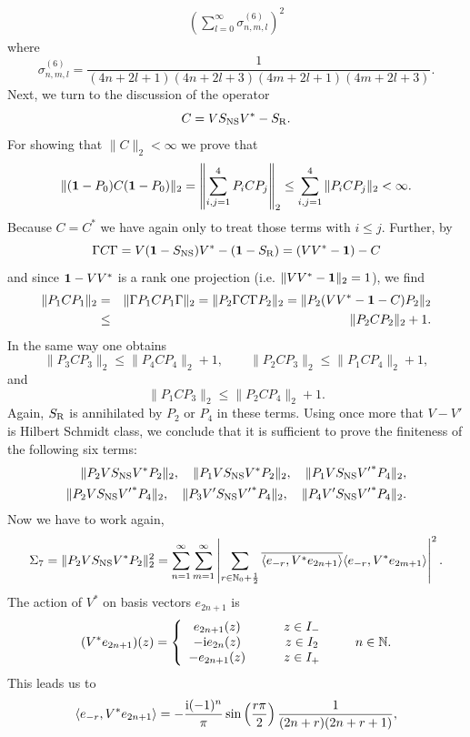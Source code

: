 \documentclass[10pt,a4paper]{article}
\begin{document}
\begin{appendix}
\begin{eqnarray*}
\left( \sum_{l=0}^\infty \sigma_{n,m,l}^{(6)} \right)^2
\end{eqnarray*}
where
\[ \sigma_{n,m,l}^{(6)} = \frac{1}{(4n+2l+1)(4n+2l+3)
(4m+2l+1)(4m+2l+3)}. \]
Next, we turn to the discussion of the operator
\[ C=VS_{\rm NS}V^*-S_{\rm R}. \]
For showing that $\|C\|_2<\infty$ we prove that
\[ \| ({\bf 1}-P_0)C({\bf 1}-P_0) \|_2 =
\left\| \sum_{i,j=1}^4 P_i C P_j \right\|_2 \le
\sum_{i,j=1}^4 \|P_i C P_j \|_2 < \infty. \]
Because $C=C^*$ we have again only to treat those terms with
$i\le j$. Further, by
\[ \Gamma C \Gamma = V({\bf 1}-S_{\rm NS})V^*-({\bf 1}-S_{\rm R})
= (VV^*-{\bf 1}) - C \]
and since ${\bf 1}-VV^*$ is a rank one projection
(i.e. $\|VV^*-{\bf 1}\|_2=1$), we find
\begin{eqnarray*}
\|P_1CP_1\|_2 &=& \| \Gamma P_1CP_1 \Gamma \|_2 =
\|P_2 \Gamma C \Gamma P_2 \|_2 =
\|P_2(VV^*-{\bf 1}-C)P_2\|_2 \\
&\le& \|P_2CP_2\|_2+1.
\end{eqnarray*}
In the same way one obtains
\[ \| P_3 C P_3 \|_2  \le \| P_4 C P_4 \|_2+1,\qquad
\| P_2 C P_3 \|_2 \le \| P_1 C P_4 \|_2+1, \]
and
\[ \| P_1 C P_3 \|_2 \le \| P_2 C P_4 \|_2+1. \]
Again, $S_{\rm R}$ is annihilated by $P_2$ or $P_4$ in
these terms. Using once more that $V-V'$ is
Hilbert Schmidt class, we conclude that it is
sufficient to prove the finiteness of the
following six terms:
\begin{eqnarray*}
\|P_2 V S_{\rm NS} V^* P_2 \|_2,\quad
\|P_1 V S_{\rm NS} V^* P_2 \|_2,\quad
\|P_1 V S_{\rm NS} {V'}^* P_4 \|_2,\\
\|P_2 V S_{\rm NS} {V'}^* P_4 \|_2,\quad
\|P_3 V' S_{\rm NS} {V'}^* P_4 \|_2,\quad
\|P_4 V' S_{\rm NS} {V'}^* P_4 \|_2.
\end{eqnarray*}
Now we have to work again,
\[ \Sigma_7 = \| P_2 V S_{\rm NS} V^* P_2 \|_2^2
= \sum_{n=1}^\infty \sum_{m=1}^\infty \left|
\sum_{r \in \mathbb{N}_0 +\frac{1}{2}}
\overline{ \langle e_{-r}, V^* e_{2n+1} \rangle }
\langle e_{-r}, V^* e_{2m+1} \rangle \right|^2 .\]
The action of $V^*$ on basis vectors $e_{2n+1}$ is
\[ (V^*e_{2n+1})(z) = \left\{ \begin{array}{cc} e_{2n+1}(z) &
\qquad z \in I_- \\
-{\rm i} e_{2n}(z) & \qquad z \in I_2 \\ -e_{2n+1}(z) & \qquad z
\in I_+ \end{array} \right. \qquad n\in\mathbb{N}.\]
This leads us to
\[ \langle e_{-r}, V^*  e_{2n+1} \rangle =  -\frac{{\rm i} (-1)^n}{\pi}
\sin\left(\frac{r\pi}{2}\right)\frac{1}{(2n+r)(2n+r+1)},\]

\end{appendix}
\end{document}
